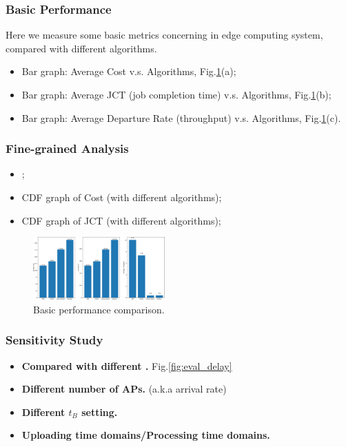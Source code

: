     \subsubsection{Basic Performance}
    Here we measure some basic metrics concerning in edge computing system, compared with different algorithms.
    \begin{itemize}
        \item Bar graph: Average Cost v.s. Algorithms, Fig.\ref{fig:bar_plot}(a);
        \item Bar graph: Average JCT (job completion time) v.s. Algorithms, Fig.\ref{fig:bar_plot}(b); %
        \item Bar graph: Average Departure Rate (throughput) v.s. Algorithms, Fig.\ref{fig:bar_plot}(c). 
    \end{itemize}

    \subsubsection{Fine-grained Analysis}
    \begin{itemize}
        \item {};
        \item CDF graph of Cost (with different algorithms);
        \item CDF graph of JCT (with different algorithms);
    \end{itemize}

    \begin{figure}[htp!]
        \centering
        \includegraphics[width=0.45\textwidth]{images/bar_graph.pdf}
        \caption{Basic performance comparison.}
        \label{fig:bar_plot}
    \end{figure}

    \subsubsection{Sensitivity Study}
    \begin{itemize}
        \item \textbf{Compared with different \brlatency.} Fig.\ref{fig:eval_delay}
        \item \textbf{Different number of APs.} (a.k.a arrival rate)
        \item \textbf{Different $t_B$ setting.}
        \item \textbf{Uploading time domains/Processing time domains.}
    \end{itemize}

